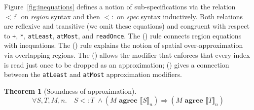\documentclass[10pt,preprint]{sigplanconf}
\newcounter{block}
\theoremstyle{definition}
\newtheorem{theorem}[block]{Theorem}
\newcommand{\interp}[1]{\llbracket{#1}\rrbracket}
\newcommand{\term}[1]{\texttt{#1}}
\newcommand{\trule}[1]{{\footnotesize{(\text{#1})}}}
\newcommand{\consAName}{\textbf{agree}}
\newcommand{\consA}[2]{#1 \,\, \consAName{} \,\, #2}
\begin{document}
Figure~\ref{fig:inequations} defines a notion of sub-specifications
via the relation $<:^r$ on \textit{region}
syntax and then $<:$ on \textit{spec} syntax inductively.
Both relations are reflexive and transitive (we omit
these equations) and congruent
with respect to \term{+}, \term{*}, \term{atLeast}, \term{atMost},
and \term{readOnce}. The \trule{\textsc{eq}} rule connects region
equations with inequations. The \trule{\textsc{over}} rule explains
the notion of spatial over-approximation via overlapping regions.
The \trule{\textsc{rep}} allows the modifier that
enforces that every index is read just once to be dropped
as an approximation; \trule{\textsc{bound}} gives
a connection between the \term{atLeast} and \term{atMost}
approximation modifiers.

\begin{theorem}[Soundness of approximation]
\begin{equation*}
\forall S, T, M, n . \quad
S <: T \; \wedge (\consA{M}{\interp{S}_n})
\Rightarrow (\consA{M}{\interp{T}_n})
\end{equation*}
\end{theorem}
\end{document}
